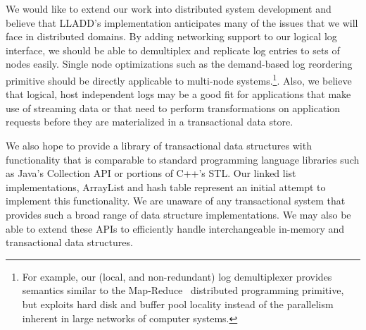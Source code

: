 \documentclass[10pt,letterpaper,twocolumn,english]{article}
\newcommand{\yad}{LLADD\xspace}
\begin{document}
We would like to extend our work into distributed system
development and believe that \yad's implementation anticipates many
of the issues that we will face in distributed domains.  By adding 
networking support to our logical log interface,
we should be able to demultiplex and replicate log entries to sets of
nodes easily.  Single node optimizations such as the demand-based log
reordering primitive should be directly applicable to multi-node
systems.\footnote{For example, our (local, and non-redundant) log
demultiplexer provides semantics similar to the
Map-Reduce~\cite{mapReduce} distributed programming primitive, but
exploits hard disk and buffer pool locality instead of the parallelism
inherent in large networks of computer systems.}.  Also, we believe
that logical, host independent logs may be a good fit for applications
that make use of streaming data or that need to perform
transformations on application requests before they are materialized
in a transactional data store.

We also hope to provide a library of transactional data structures
with functionality that is comparable to standard programming language
libraries such as Java's Collection API or portions of C++'s STL.  Our
linked list implementations, ArrayList and hash table represent an
initial attempt to implement this functionality.  We are unaware of
any transactional system that provides such a broad range of data
structure implementations.  We may also be able to extend these
APIs to efficiently handle interchangeable in-memory and transactional data structures.


\end{document}
